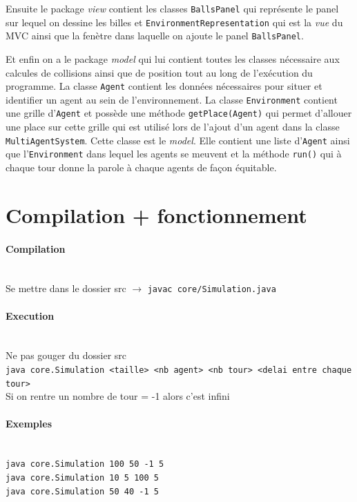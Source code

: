 \documentclass[a4paper,10pt]{article}
\begin{document}
Ensuite le package \emph{view} contient les classes \verb&BallsPanel& qui repr\'esente le panel sur lequel on dessine les billes et \verb&EnvironmentRepresentation& qui est la \emph{vue} du MVC ainsi que la fen\`etre dans laquelle on ajoute le panel \verb&BallsPanel&. 

Et enfin on a le package \emph{model} qui lui contient toutes les classes n\'ecessaire aux calcules de collisions ainsi que de position tout au long de l'ex\'ecution du programme. La classe \verb&Agent& contient les donn\'ees n\'ecessaires pour situer et identifier un agent au sein de l'environnement. La classe \verb&Environment& contient une grille d'\verb&Agent& et poss\`ede une m\'ethode \verb&getPlace(Agent)& qui permet d'allouer une place sur cette grille qui est utilis\'e lors de l'ajout d'un agent dans la classe \verb&MultiAgentSystem&. Cette classe est le \emph{model}. Elle contient une liste d'\verb&Agent& ainsi que l'\verb&Environment& dans lequel les agents se meuvent et la m\'ethode \verb&run()& qui \`a chaque tour donne la parole \`a chaque agents de fa\c{c}on \'equitable.
 
\section{Compilation + fonctionnement}
 
\paragraph{Compilation} ~\\
Se mettre dans le dossier src $\rightarrow$ \verb&javac core/Simulation.java&

\paragraph{Execution} ~\\
Ne pas gouger du dossier src \\
\verb&java core.Simulation <taille> <nb agent> <nb tour> <delai entre chaque tour>& \\
Si on rentre un nombre de tour = -1 alors c'est infini

\paragraph{Exemples} ~\\
\verb&java core.Simulation 100 50 -1 5& \\
\verb&java core.Simulation 10 5 100 5& \\
\verb&java core.Simulation 50 40 -1 5& \\
\end{document}
